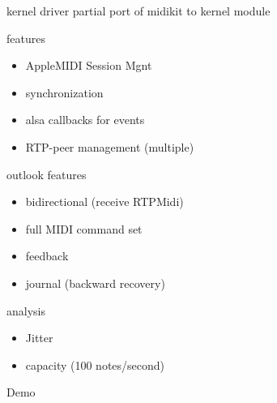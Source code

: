 \begin{frame}{kernel driver}
	partial port of midikit to kernel module
	
	features
	\begin{itemize}
		\item AppleMIDI Session Mgnt
		\item synchronization
		\item alsa callbacks for events
		\item RTP-peer management (multiple)
	\end{itemize}
\end{frame}

\begin{frame}{outlook}
	features
	\begin{itemize}
		\item bidirectional (receive RTPMidi)
		\item full MIDI command set
		\item feedback
		\item journal (backward recovery)
	\end{itemize}
	\pause
	analysis
	\begin{itemize}
		\item Jitter
		\item capacity (100 notes/second)
	\end{itemize}
\end{frame}

\begin{frame}
	\centering
	\Huge Demo
\end{frame}
